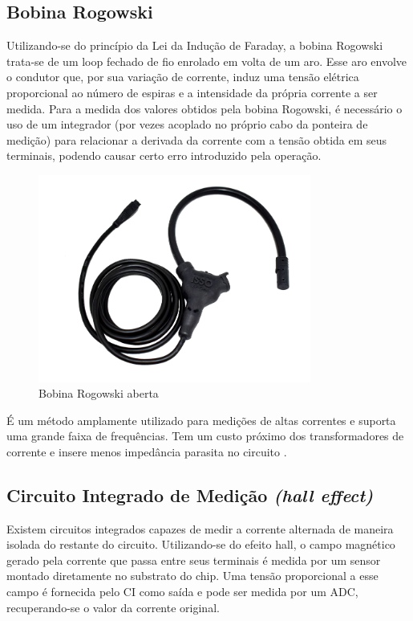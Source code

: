 \subsection{Bobina Rogowski}\label{subsec:Rogowski}

Utilizando-se do princípio da Lei da Indução de Faraday, a bobina Rogowski trata-se de um loop fechado de fio enrolado em volta de um aro. Esse aro envolve o condutor que, por sua variação de corrente, induz uma tensão elétrica proporcional ao número de espiras e a intensidade da própria corrente a ser medida. Para a medida dos valores obtidos pela bobina Rogowski, é necessário o uso de um integrador (por vezes acoplado no próprio cabo da ponteira de medição) para relacionar a derivada da corrente com a tensão obtida em seus terminais, podendo causar certo erro introduzido pela operação.

\begin{figure}[htb!]
    \caption{Bobina Rogowski aberta}
    \label{fig:rogowski-bobina}
    \includegraphics[width=0.8\textwidth]{figuras/bobina-rogowski.png}
\end{figure}

É um método amplamente utilizado para medições de altas correntes e suporta uma grande faixa de frequências. Tem um custo próximo dos transformadores de corrente e insere menos impedância parasita no circuito \citep{curr_sens_tech}.

\subsection{Circuito Integrado de Medição \textit{(hall effect)}}\label{subsec:halleffect}

Existem circuitos integrados capazes de medir a corrente alternada de maneira isolada do restante do circuito. Utilizando-se do efeito hall, o campo magnético gerado pela corrente que passa entre seus terminais é medida por um sensor montado diretamente no substrato do chip. Uma tensão proporcional a esse campo é fornecida pelo CI como saída e pode ser medida por um ADC, recuperando-se o valor da corrente original.

